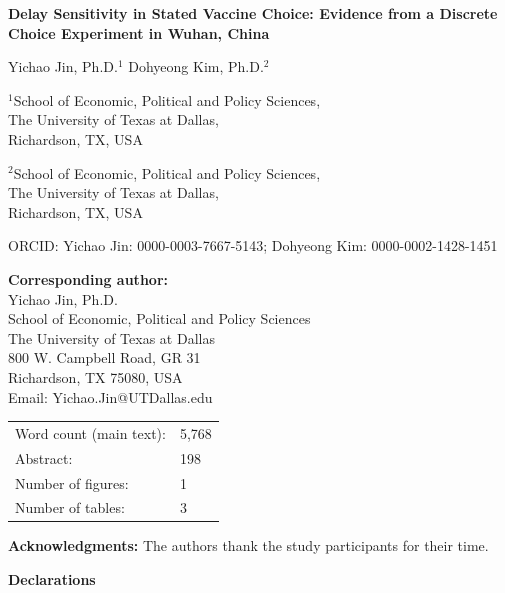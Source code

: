 \documentclass[12pt]{article}
\begin{document}
\thispagestyle{empty}
\begin{center}
{\Large \textbf{Delay Sensitivity in Stated Vaccine Choice: Evidence from a Discrete Choice Experiment in Wuhan, China}}

\vspace{1.5em}

{\large Yichao Jin, Ph.D.${}^1$ \quad Dohyeong Kim, Ph.D.${}^2$}

\vspace{1em}
$^1$School of Economic, Political and Policy Sciences, \\
The University of Texas at Dallas, \\
Richardson, TX, USA

\vspace{0.5em}
$^2$School of Economic, Political and Policy Sciences, \\
The University of Texas at Dallas, \\
Richardson, TX, USA

\vspace{1em}
ORCID: Yichao Jin: 0000-0003-7667-5143; Dohyeong Kim: 0000-0002-1428-1451

\vspace{1.5em}
\textbf{Corresponding author:} \\
Yichao Jin, Ph.D. \\
School of Economic, Political and Policy Sciences \\
The University of Texas at Dallas \\
800 W. Campbell Road, GR 31 \\
Richardson, TX 75080, USA \\
Email: Yichao.Jin@UTDallas.edu

\vspace{1.5em}
\begin{tabular}{ll}
Word count (main text): & 5,768 \\
Abstract: & 198 \\
Number of figures: & 1 \\
Number of tables: & 3 \\
\end{tabular}
\end{center}

\vspace{1em}
\noindent\textbf{Acknowledgments:} The authors thank the study participants for their time.

\vspace{1.5em}
\noindent\textbf{Declarations}
\end{document}
